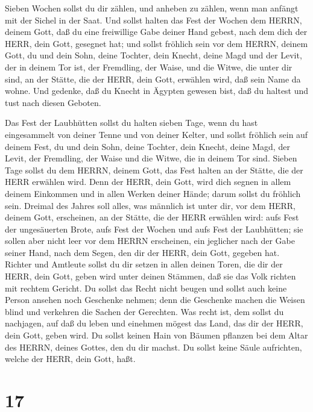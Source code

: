  Sieben Wochen sollst du dir zählen, und anheben zu zählen,
wenn man anfängt mit der Sichel in der Saat.  Und sollst
halten das Fest der Wochen dem HERRN, deinem Gott, daß du eine
freiwillige Gabe deiner Hand gebest, nach dem dich der HERR, dein Gott,
gesegnet hat;  und sollst fröhlich sein vor dem HERRN,
deinem Gott, du und dein Sohn, deine Tochter, dein Knecht, deine Magd
und der Levit, der in deinem Tor ist, der Fremdling, der Waise, und die
Witwe, die unter dir sind, an der Stätte, die der HERR, dein Gott,
erwählen wird, daß sein Name da wohne.  Und gedenke, daß du
Knecht in Ägypten gewesen bist, daß du haltest und tust nach diesen
Geboten.

 Das Fest der Laubhütten sollst du halten sieben Tage, wenn
du hast eingesammelt von deiner Tenne und von deiner Kelter,
 und sollst fröhlich sein auf deinem Fest, du und dein
Sohn, deine Tochter, dein Knecht, deine Magd, der Levit, der Fremdling,
der Waise und die Witwe, die in deinem Tor sind.  Sieben
Tage sollst du dem HERRN, deinem Gott, das Fest halten an der Stätte,
die der HERR erwählen wird. Denn der HERR, dein Gott, wird dich segnen
in allem deinem Einkommen und in allen Werken deiner Hände; darum sollst
du fröhlich sein.  Dreimal des Jahres soll alles, was
männlich ist unter dir, vor dem HERR, deinem Gott, erscheinen, an der
Stätte, die der HERR erwählen wird: aufs Fest der ungesäuerten Brote,
aufs Fest der Wochen und aufs Fest der Laubhütten; sie sollen aber nicht
leer vor dem HERRN erscheinen,  ein jeglicher nach der Gabe
seiner Hand, nach dem Segen, den dir der HERR, dein Gott, gegeben hat.
 Richter und Amtleute sollst du dir setzen in allen deinen
Toren, die dir der HERR, dein Gott, geben wird unter deinen Stämmen, daß
sie das Volk richten mit rechtem Gericht.  Du sollst das
Recht nicht beugen und sollst auch keine Person ansehen noch Geschenke
nehmen; denn die Geschenke machen die Weisen blind und verkehren die
Sachen der Gerechten.  Was recht ist, dem sollst du
nachjagen, auf daß du leben und einehmen mögest das Land, das dir der
HERR, dein Gott, geben wird.  Du sollst keinen Hain von
Bäumen pflanzen bei dem Altar des HERRN, deines Gottes, den du dir
machst.  Du sollst keine Säule aufrichten, welche der HERR,
dein Gott, haßt.

\hypertarget{section-16}{%
\section{17}\label{section-16}}

